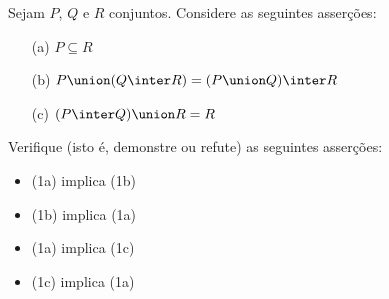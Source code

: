 \begin{exercise}
Sejam $P$, $Q$ e $R$ conjuntos. Considere as seguintes asserções:
\begin{itemize}
  \item[(a)] $P \subseteq R$
  \item[(b)] $P \union (Q \inter R) = (P \union Q) \inter R$
  \item[(c)] $(P \inter Q) \union R = R$
\end{itemize}

Verifique (isto é, demonstre ou refute) as seguintes asserções:
\begin{itemize}
  \item (1a) implica (1b)
  \item (1b) implica (1a)
  \item (1a) implica (1c)
  \item (1c) implica (1a)
\end{itemize}
\end{exercise}
